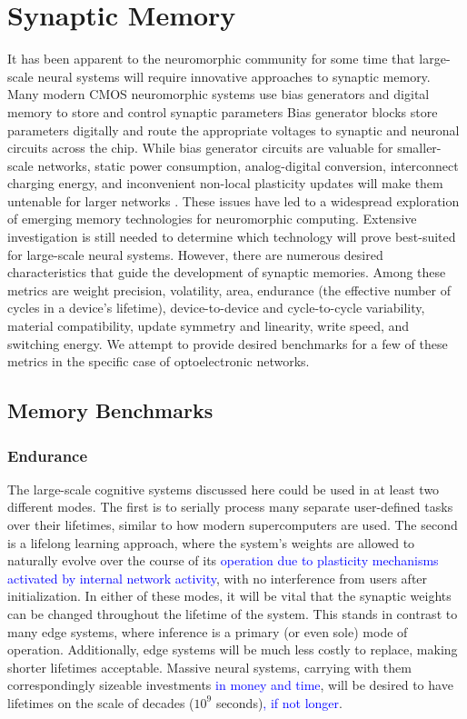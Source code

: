 \documentclass[twocolumn]{article}
\begin{document}
\section{\label{sec:memory}Synaptic Memory}
It has been apparent to the neuromorphic community for some time that large-scale neural systems will require innovative approaches to synaptic memory. Many modern CMOS neuromorphic systems use bias generators and digital memory to store and control synaptic parameters \cite{liu2014event} Bias generator blocks store parameters digitally and route the appropriate voltages to synaptic and neuronal circuits across the chip. While bias generator circuits are valuable for smaller-scale networks, static power consumption, analog-digital conversion, interconnect charging energy, and inconvenient non-local plasticity updates will make them untenable for larger networks \cite{dalgaty2019hybrid}. These issues have led to a widespread exploration of emerging memory technologies for neuromorphic computing. Extensive investigation is still needed to determine which technology will prove best-suited for large-scale neural systems. However, there are numerous desired characteristics that guide the development of synaptic memories. Among these metrics are weight precision, volatility, area, endurance (the effective number of cycles in a device's lifetime), device-to-device and cycle-to-cycle variability, material compatibility, update symmetry and linearity, write speed, and switching energy. We attempt to provide desired benchmarks for a few of these metrics in the specific case of optoelectronic networks.
\subsection{Memory Benchmarks}
\subsubsection{Endurance}
The large-scale cognitive systems discussed here could be used in at least two different modes. The first is to serially process many separate user-defined tasks over their lifetimes, similar to how modern supercomputers are used. The second is a lifelong learning approach, where the system's weights are allowed to naturally evolve over the course of its \textcolor{blue}{operation due to plasticity mechanisms activated by internal network activity}, with no interference from users after initialization. In either of these modes, it will be vital that the synaptic weights can be changed throughout the lifetime of the system. This stands in contrast to many edge systems, where inference is a primary (or even sole) mode of operation. Additionally, edge systems will be much less costly to replace, making shorter lifetimes acceptable. Massive neural systems, carrying with them correspondingly sizeable investments \textcolor{blue}{in money and time}, will be desired to have lifetimes on the scale of decades ($10^9$ seconds)\textcolor{blue}{, if not longer}.
\end{document}
